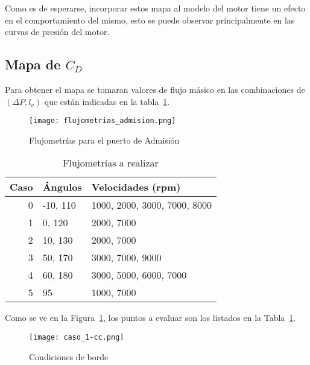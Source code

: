 Como es de esperarse, incorporar estos mapa al modelo del motor tiene un efecto
en el comportamiento del mismo, esto se puede observar principalmente en las
curvas de presión del motor.

\subsection{Mapa de $C_D$}
%
Para obtener el mapa se tomaran valores de flujo másico en las combinaciones de
$(\Delta P, l_v)$ que están indicadas en la tabla~\ref{tab:casos}.
%
%

\begin{figure}
    \centering
    \texttt{[image: flujometrias\_admision.png]}
    \caption{Flujometrías para el puerto de Admisión}\label{fig:flujometrias}
\end{figure}

\begin{table}
    \centering
    \begin{tabular}{rll} \toprule
        Caso & Ángulos  & Velocidades (rpm) \\ \midrule
        0    & -10, 110 & 1000, 2000, 3000, 7000, 8000 \\
        1    & 0, 120   & 2000, 7000 \\
        2    & 10, 130  & 2000, 7000 \\
        3    & 50, 170  & 3000, 7000, 9000 \\
        4    & 60, 180  & 3000, 5000, 6000, 7000 \\
        5    & 95       & 1000, 7000\\ \bottomrule
    \end{tabular}
    \caption{Flujometrías a realizar}\label{tab:casos}
\end{table}

Como se ve en la Figura~\ref{fig:flujometrias}, los puntos a evaluar son los
listados en la Tabla~\ref{tab:casos}.



\begin{figure}[h]
    \texttt{[image: caso\_1-cc.png]}
    \caption{Condiciones de borde}\label{fig:geom}
\end{figure}

